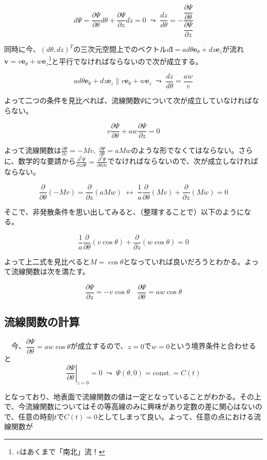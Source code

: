 \documentclass[ja=standard,xelatex]{bxjsarticle}
\newcommand{\neqn}[1]{\begin{equation}{#1}\end{equation}}
\newcommand{\dif}[2]{\dfrac{d#1}{d#2}}
\newcommand{\pdif}[2]{\dfrac{\partial{#1}}{\partial#2}}
\newcommand{\pdifop}[1]{\dfrac{\partial}{\partial#1}}
\newcommand{\vect}[1]{\mathbf{#1}}
\newcommand{\bracketnormal}[1]{\left(#1\right)}
\begin{document}
\neqn{
  d\Psi = \pdif{\Psi}{\theta}d\theta + \pdif{\Psi}{z}dz = 0 \; \leadsto \; \dif{z}{\theta} = -\dfrac{\pdif{\Psi}{\theta}}{\pdif{\Psi}{z}}
}

同時に今、$\bracketnormal{d\theta ,dz}^T$の三次元空間上でのベクトル$d\vect{l} = ad\theta\vect{e}_\theta + dz\vect{e}_z$が流れ$\vect{v} = v\vect{e}_\theta + w\vect{e}_z$\footnote{
  $v$はあくまで「南北」流！
}と平行でなければならないので次が成立する。

\neqn{
  ad\theta\vect{e}_\theta + dz\vect{e}_z \parallel v\vect{e}_\theta + w\vect{e}_z\;\leadsto \; \dif{z}{\theta} = \dfrac{aw}{v}
}

よって二つの条件を見比べれば、流線関数$\Psi$について次が成立していなければならない。

\neqn{
  v\pdif{\Psi}{\theta} + aw\pdif{\Psi}{z} = 0
}

よって流線関数は$\frac{\partial \Psi}{\partial z} = -Mv,\; \frac{\partial \Psi}{\partial \theta} = aMw$のような形でなくてはならない。さらに、数学的な要請から$\frac{\partial^2 \Psi}{\partial z\partial\theta} = \frac{\partial^2 \Psi}{\partial \theta\partial z}$でなければならないので、次が成立しなければならない。

\neqn{
  \pdifop{\theta}\bracketnormal{-Mv} = \pdifop{z}\bracketnormal{aMw}\;\leftrightarrow \; \dfrac{1}{a}\pdifop{\theta}\bracketnormal{Mv} + \pdifop{z}\bracketnormal{Mw} = 0
}

そこで、非発散条件を思い出してみると、（整理することで）以下のようになる。

\neqn{
  \dfrac{1}{a}\pdifop{\theta}\bracketnormal{v\cos\theta} + \pdifop{z}\bracketnormal{w\cos\theta}=0
}

よって上二式を見比べると$M=\cos\theta$となっていれば良いだろうとわかる。よって流線関数は次を満たす。

\neqn{
  \pdif{\Psi}{z} = -v\cos\theta\quad \pdif{\Psi}{\theta} = aw\cos\theta
}

\subsection{流線関数の計算}
　今、$\pdif{\Psi}{\theta} = aw\cos\theta$が成立するので、$z=0$で$w=0$という境界条件と合わせると
\neqn{
  \left.\pdif{\Psi}{\theta}\right|_{z=0} = 0 \;\leadsto \; \Psi\bracketnormal{\theta,0} = \text{const.} = C(t)
}

となっており、地表面で流線関数の値は一定となっていることがわかる。その上で、今流線関数についてはその等高線のみに興味があり定数の差に関心はないので、任意の時刻$t$で$C(t)=0$としてしまって良い。よって、任意の点における流線関数が
\end{document}

